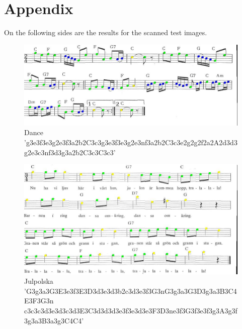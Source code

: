 \section*{Appendix}

On the following sides are the results for the scanned test images.

\begin{figure}
    \centering
		\includegraphics[width=\textwidth]{im1s_compare.jpg}
		\caption[Dance]{Dance  'g3e3f3e3g2e3f3a2b2C3c3g3e3f3e3g2e3nf3a2b2C3c3e2g2g2f2a2A2d3d3g2e3c3nf3d3g3a2b2C3c3C3c3'}
\end{figure}

\begin{figure}
    \centering
		\includegraphics[width=\textwidth]{im3s_compare.jpg}
		\caption[Julpolska]{Julpolska 'G3g3a3G3E3e3f3E3D3d3e3d3b2c3d3e3f3G3nG3g3a3G3D3g3a3B3C4E3F3G3n \newline c3c3c3d3e3d3c3d3E3C3d3d3d3e3f3e3d3e3F3D3ne3f3G3f3e3f3g3A3g3f3g3a3B3a3g3C4C4'}
\end{figure}

